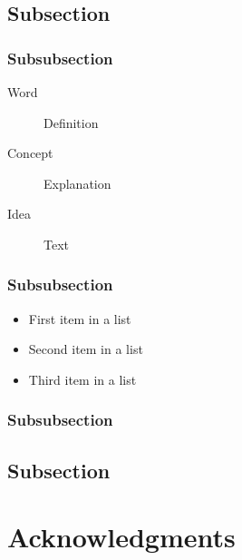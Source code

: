 \documentclass[fleqn,10pt]{SelfArx} %
\begin{document}
\lipsum[10] %

\subsection{Subsection}

\lipsum[11] %

\lipsum[15] %

\subsubsection{Subsubsection}

\lipsum[12] %

\begin{description}
\item[Word] Definition
\item[Concept] Explanation
\item[Idea] Text
\end{description}

\subsubsection{Subsubsection}

\lipsum[13] %

\begin{itemize}[noitemsep] %
\item First item in a list
\item Second item in a list
\item Third item in a list
\end{itemize}

\subsubsection{Subsubsection}

\lipsum[14] %

\subsection{Subsection}

\lipsum[15-23] %

\section*{Acknowledgments} %
\end{document}
